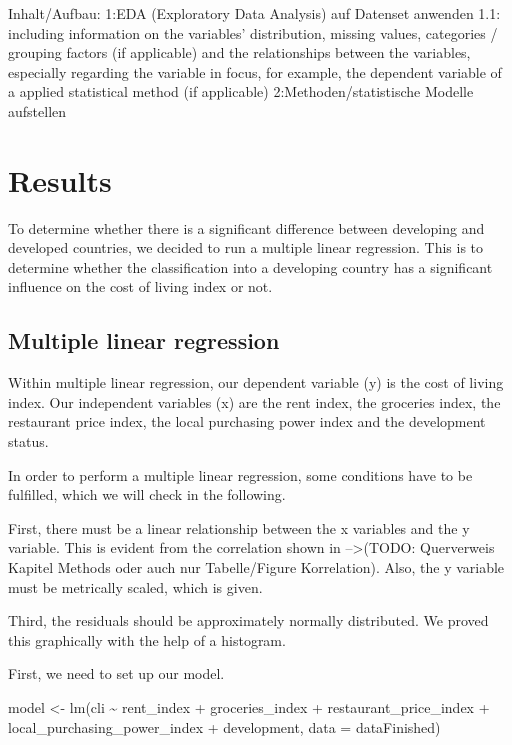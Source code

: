 \documentclass[
  11pt,
  a4paper,
  twoside]{scrbook}
\newenvironment{Shaded}{\begin{snugshade}}{\end{snugshade}}
\newcommand{\AttributeTok}[1]{\textcolor[rgb]{0.77,0.63,0.00}{#1}}
\newcommand{\FunctionTok}[1]{\textcolor[rgb]{0.00,0.00,0.00}{#1}}
\newcommand{\NormalTok}[1]{#1}
\newcommand{\OtherTok}[1]{\textcolor[rgb]{0.56,0.35,0.01}{#1}}
\newcommand{\SpecialCharTok}[1]{\textcolor[rgb]{0.00,0.00,0.00}{#1}}
\begin{document}
Inhalt/Aufbau:
1:EDA (Exploratory Data Analysis) auf Datenset anwenden
1.1: including information on the variables' distribution, missing values,
categories / grouping factors (if applicable) and the relationships between the variables, especially
regarding the variable in focus, for example, the dependent variable of a applied statistical method (if
applicable)
2:Methoden/statistische Modelle aufstellen

\hypertarget{results}{%
\chapter{Results}\label{results}}

To determine whether there is a significant difference between developing and developed countries, we decided to run a multiple linear regression. This is to determine whether the classification into a developing country has a significant influence on the cost of living index or not.

\hypertarget{multiple-linear-regression}{%
\section{Multiple linear regression}\label{multiple-linear-regression}}

Within multiple linear regression, our dependent variable (y) is the cost of living index. Our independent variables (x) are the rent index, the groceries index, the restaurant price index, the local purchasing power index and the development status.

In order to perform a multiple linear regression, some conditions have to be fulfilled, which we will check in the following.

First, there must be a linear relationship between the x variables and the y variable. This is evident from the correlation shown in --\textgreater(TODO: Querverweis Kapitel Methods oder auch nur Tabelle/Figure Korrelation).
Also, the y variable must be metrically scaled, which is given.

Third, the residuals should be approximately normally distributed. We proved this graphically with the help of a histogram.

First, we need to set up our model.

\linespread{1}

\begin{Shaded}
\begin{Highlighting}[]
\NormalTok{model }\OtherTok{\textless{}{-}} \FunctionTok{lm}\NormalTok{(cli }\SpecialCharTok{\textasciitilde{}}\NormalTok{ rent\_index }\SpecialCharTok{+}\NormalTok{ groceries\_index }\SpecialCharTok{+}\NormalTok{ restaurant\_price\_index }\SpecialCharTok{+}\NormalTok{ local\_purchasing\_power\_index }\SpecialCharTok{+}\NormalTok{ development, }\AttributeTok{data =}\NormalTok{ dataFinished)}
\end{Highlighting}
\end{Shaded}
\end{document}
